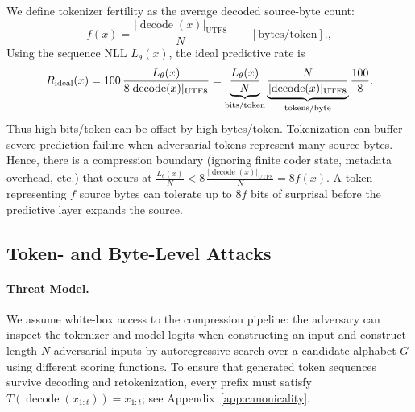 \documentclass{article}
\newcommand{\todo}[1]{\textcolor{blueprint}{[TODO: #1]}}
\newcommand{\bytes}[1]{\lvert #1\rvert_{\mathrm{UTF8}}}
\begin{document}

We define tokenizer fertility as the average decoded source-byte count:
\begin{equation} f(x)=\frac{\bytes{\operatorname{decode}(x)}}{N} \qquad [\mathrm{bytes/token}].,
\end{equation}
Using the sequence NLL $L_\theta(x)$, the ideal predictive rate is
\begin{equation}
  R_{\rm ideal}(x)=
  100\,\frac{L_\theta(x)}{8\bytes{\operatorname{decode}(x)}}
  =
  \underbrace{\frac{L_\theta(x)}{N}}_{\text{bits/token}}
  \underbrace{\frac{N}{\bytes{\operatorname{decode}(x)}}}_{\text{tokens/byte}}
  \frac{100}{8}.
  \label{eq:factorization}
\end{equation}
Thus high bits/token can be offset by high bytes/token. Tokenization can buffer
severe prediction failure when adversarial tokens represent many source bytes.
Hence, there is a compression boundary (ignoring finite coder state, metadata overhead, etc.)
that occurs at $\frac{L_\theta(x)}{N} < 8\,\frac{\bytes{\operatorname{decode}(x)}}{N} = 8 f(x)$.
 A token representing $f$ source bytes can tolerate up to $8f$ bits of
surprisal before the predictive layer expands the source.




\subsection{Token- and Byte-Level Attacks}

\paragraph{Threat Model.}
We assume white-box access to the compression pipeline: the adversary can
inspect the tokenizer and model logits when constructing
an input and construct length-$N$ adversarial inputs by autoregressive search
over a candidate alphabet $G$ using different scoring functions. To ensure that
generated token sequences survive decoding and retokenization, every prefix
must satisfy $T(\operatorname{decode}(x_{1:t}))=x_{1:t}$; see
Appendix~\ref{app:canonicality}.
\end{document}
